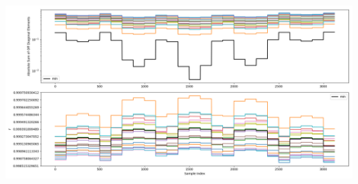 \documentclass{article}
\begin{document}
\begin{center}
\includegraphics[scale=.9]{report_pickled_controls261/control_dpn_all.png}

\end{center}
\end{document}
